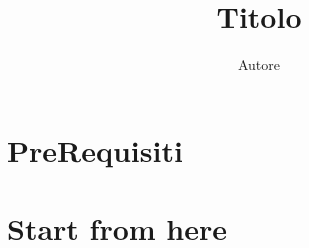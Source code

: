 \documentclass[10pt,oneside,a4paper]{article}
\author{ Autore }
\title{ Titolo }
\theoremstyle{plain}%
\theoremstyle{definition}
\theoremstyle{remark}
\begin{document}
\maketitle
\vspace{1cm}
\begin{abstract}

\end{abstract}
\vspace{1cm}
\tableofcontents
\newpage

\section{PreRequisiti}


\section{Start from here}
\end{document}
